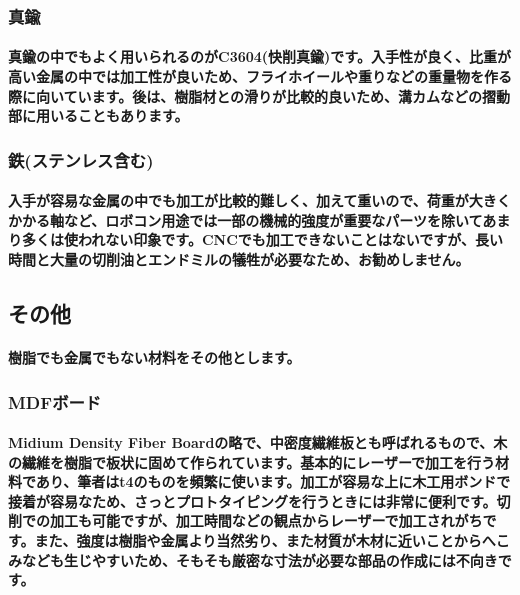 \documentclass[b5paper, 9pt, twocolumn, titlepage,openany]{jsbook}%
\begin{document}

\subsubsection{真鍮}

\paragraph{真鍮の中でもよく用いられるのがC3604(快削真鍮)です。入手性が良く、比重が高い金属の中では加工性が良いため、フライホイールや重りなどの重量物を作る際に向いています。後は、樹脂材との滑りが比較的良いため、溝カムなどの摺動部に用いることもあります。}

\subsubsection{鉄(ステンレス含む)}

\paragraph{入手が容易な金属の中でも加工が比較的難しく、加えて重いので、荷重が大きくかかる軸など、ロボコン用途では一部の機械的強度が重要なパーツを除いてあまり多くは使われない印象です。CNCでも加工できないことはないですが、長い時間と大量の切削油とエンドミルの犠牲が必要なため、お勧めしません。}

\subsection{その他}

\paragraph{樹脂でも金属でもない材料をその他とします。}

\subsubsection{MDFボード}

\paragraph{Midium Density Fiber Boardの略で、中密度繊維板とも呼ばれるもので、木の繊維を樹脂で板状に固めて作られています。基本的にレーザーで加工を行う材料であり、筆者はt4のものを頻繁に使います。加工が容易な上に木工用ボンドで接着が容易なため、さっとプロトタイピングを行うときには非常に便利です。切削での加工も可能ですが、加工時間などの観点からレーザーで加工されがちです。また、強度は樹脂や金属より当然劣り、また材質が木材に近いことからへこみなども生じやすいため、そもそも厳密な寸法が必要な部品の作成には不向きです。}
\end{document}

